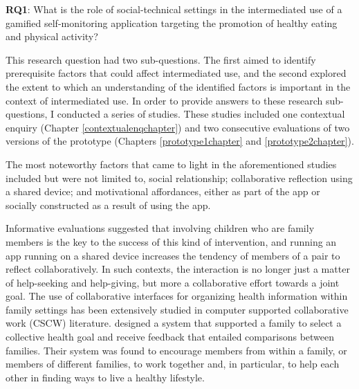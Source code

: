 \textbf{RQ1}: What is the role of social-technical settings in the intermediated use of a gamified self-monitoring application targeting the promotion of healthy eating and physical activity? 

This research question had two sub-questions. The first aimed to identify prerequisite factors that could affect intermediated use, and the second explored the extent to which an understanding of the identified factors is important in the context of intermediated use. In order to provide answers to these research sub-questions, I conducted a series of studies. These studies included one contextual enquiry (Chapter \ref{contextualenqchapter}) and two consecutive evaluations of two versions of the prototype (Chapters \ref{prototype1chapter} and \ref{prototype2chapter}). 

The most noteworthy factors that came to light in the aforementioned studies included but were not limited to, social relationship; collaborative reflection using a shared device; and motivational affordances, either as part of the app or socially constructed as a result of using the app. 

Informative evaluations suggested that involving children who are family members is the key to the success of this kind of intervention, and running an app running on a shared device increases the tendency of members of a pair to reflect collaboratively. In such contexts, the interaction is no longer just a matter of help-seeking and help-giving, but more a collaborative effort towards a joint goal. The use of collaborative interfaces for organizing health information within family settings has been extensively studied in computer supported collaborative work (CSCW) literature. \cite{colineau2011motivating} designed a system that supported a family to select a collective health goal and receive feedback that entailed comparisons between families. Their system was found to encourage members from within a family, or members of different families, to work together and, in particular, to help each other in finding ways to live a healthy lifestyle. 

